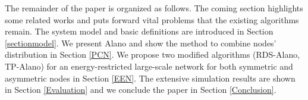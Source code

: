 The remainder of the paper is organized as follows. The coming section highlights some related works and puts forward vital problems that the existing algorithms remain. The system model and basic definitions are introduced in Section \ref{sectionmodel}. We present Alano and show the method to combine nodes' distribution in Section \ref{PCN}. We propose two modified algorithms (RDS-Alano, TP-Alano) for an energy-restricted large-scale network for both symmetric and asymmetric nodes in Section \ref{EEN}. The extensive simulation results are shown in Section \ref{Evaluation} and we conclude the paper in Section \ref{Conclusion}.
